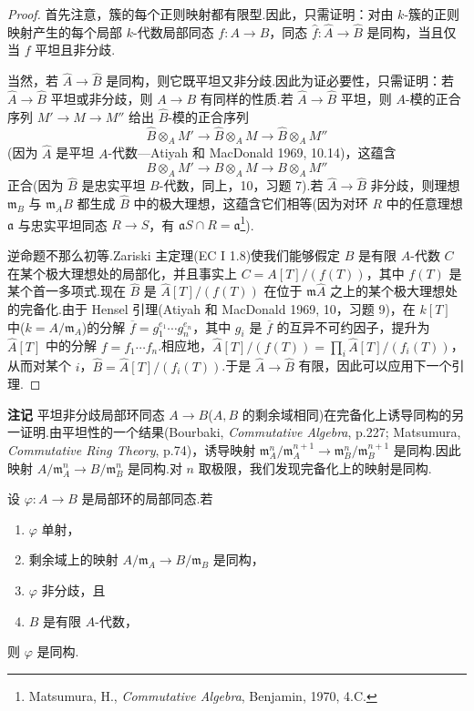 \begin{proof}
首先注意，簇的每个正则映射都有限型.因此，只需证明：对由 $k$-簇的正则映射产生的每个局部 $k$-代数局部同态 $f \colon A \to B$，同态 $\widehat{f} \colon \widehat{A} \to \widehat{B}$ 是同构，当且仅当 $f$ 平坦且非分歧.

当然，若 $\widehat{A} \to \widehat{B}$ 是同构，则它既平坦又非分歧.因此为证必要性，只需证明：若 $\widehat{A} \to \widehat{B}$ 平坦或非分歧，则 $A \to B$ 有同样的性质.若 $\widehat{A} \to \widehat{B}$ 平坦，则 $A$-模的正合序列 $M' \to M \to M''$ 给出 $\widehat{B}$-模的正合序列
\[
\widehat{B} \otimes_{A} M' \to \widehat{B} \otimes_{A} M \to \widehat{B} \otimes_{A} M''
\]
(因为 $\widehat{A}$ 是平坦 $A$-代数---Atiyah 和 MacDonald 1969, 10.14)，这蕴含
\[
B \otimes_{A} M' \to B \otimes_{A} M \to B \otimes_{A} M''
\]
正合(因为 $\widehat{B}$ 是忠实平坦 $B$-代数，同上，10，习题 7).若 $\widehat{A} \to \widehat{B}$ 非分歧，则理想 $\mathfrak{m}_{B}$ 与 $\mathfrak{m}_{A}B$ 都生成 $\widehat{B}$ 中的极大理想，这蕴含它们相等(因为对环 $R$ 中的任意理想 $\mathfrak{a}$ 与忠实平坦同态 $R \to S$，有 $\mathfrak{a}S \cap R = \mathfrak{a}$\footnote{Matsumura, H., \emph{Commutative Algebra}, Benjamin, 1970, 4.C.}).

逆命题不那么初等.Zariski 主定理(EC I 1.8)使我们能够假定 $B$ 是有限 $A$-代数 $C$ 在某个极大理想处的局部化，并且事实上 $C = A[T]/(f(T))$，其中 $f(T)$ 是某个首一多项式.现在 $\widehat{B}$ 是 $\widehat{A}[T]/(f(T))$ 在位于 $\mathfrak{m}\widehat{A}$ 之上的某个极大理想处的完备化.由于 Hensel 引理(Atiyah 和 MacDonald 1969, 10，习题 9)，在 $k[T]$ 中($k = A/\mathfrak{m}_{A}$)的分解 $\overline{f} = g^{e_1}_{1} \cdots g^{e_n}_{n}$，其中 $g_i$ 是 $\overline{f}$ 的互异不可约因子，提升为 $\widehat{A}[T]$ 中的分解 $f = f_1 \cdots f_n$.相应地，$\widehat{A}[T]/(f(T)) = \prod_{i} \widehat{A}[T]/(f_i(T))$，从而对某个 $i$，$\widehat{B} = \widehat{A}[T]/(f_i(T))$.于是 $\widehat{A} \to \widehat{B}$ 有限，因此可以应用下一个引理.
\end{proof}

\textbf{注记} 平坦非分歧局部环同态 $A \to B$($A, B$ 的剩余域相同)在完备化上诱导同构的另一证明.由平坦性的一个结果(Bourbaki, \emph{Commutative Algebra}, p.227; Matsumura, \emph{Commutative Ring Theory}, p.74)，诱导映射 $\mathfrak{m}^{n}_{A}/\mathfrak{m}^{n+1}_{A} \to \mathfrak{m}^{n}_{B}/\mathfrak{m}^{n+1}_{B}$ 是同构.因此映射 $A/\mathfrak{m}^{n}_{A} \to B/\mathfrak{m}^{n}_{B}$ 是同构.对 $n$ 取极限，我们发现完备化上的映射是同构.

\begin{lemma}\label{lem:2.10}
设 $\varphi \colon A \to B$ 是局部环的局部同态.若
\begin{enumerate}
  \item $\varphi$ 单射，
  \item 剩余域上的映射 $A/\mathfrak{m}_{A} \to B/\mathfrak{m}_{B}$ 是同构，
  \item $\varphi$ 非分歧，且
  \item $B$ 是有限 $A$-代数，
\end{enumerate}
则 $\varphi$ 是同构.
\end{lemma}

